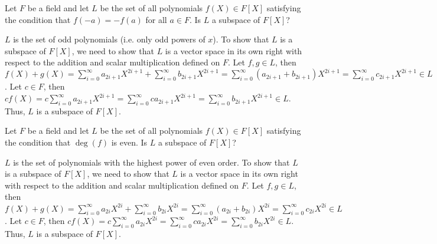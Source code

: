 \begin{ProbBox} %
\begin{problem}[Golan 132]
Let $F$ be a field and let $L$ be the set of all polynomials $f(X) \in F[X]$
satisfying the condition that $f(-a) = -f(a)$ for all $a\in F$.  Is $L$ a
subspace of $F[X]$?
\end{problem}
\smallskip
\begin{solution}
$L$ is the set of odd polynomials (i.e. only odd powers of $x$). To show that $L$ is a subspace of $F[X]$, we need to show that $L$ is a vector space in its own right with respect to the addition and scalar multiplication defined on $F$. Let $f,g \in L$, then $f(X)+g(X)=\sum\limits_{i=0}^\infty a_{2i+1}X^{2i+1} + \sum\limits_{i=0}^\infty b_{2i+1}X^{2i+1} = \sum\limits_{i=0}^\infty (a_{2i+1} + b_{2i+1})X^{2i+1} = \sum\limits_{i=0}^\infty c_{2i+1}X^{2i+1} \in L$. Let $c \in F$, then $cf(X) = c\sum\limits_{i=0}^\infty a_{2i+1}X^{2i+1} = \sum\limits_{i=0}^\infty ca_{2i+1}X^{2i+1} = \sum\limits_{i=0}^\infty b_{2i+1}X^{2i+1} \in L$. Thus, $L$ is a subspace of $F[X]$.
\end{solution}
\end{ProbBox}
\probskip

\begin{ProbBox} %
\begin{problem}[Golan 133]
Let $F$ be a field and let $L$ be the set of all polynomials $f(X) \in F[X]$
satisfying the condition that $\deg(f)$ is even.  Is $L$ a subspace of $F[X]$?
\end{problem}
\smallskip
\begin{solution}
$L$ is the set of polynomials with the highest power of even order. To show that $L$ is a subspace of $F[X]$, we need to show that $L$ is a vector space in its own right with respect to the addition and scalar multiplication defined on $F$. Let $f,g \in L$, then $f(X)+g(X)=\sum\limits_{i=0}^\infty a_{2i}X^{2i} + \sum\limits_{i=0}^\infty b_{2i}X^{2i} = \sum\limits_{i=0}^\infty (a_{2i} + b_{2i})X^{2i} = \sum\limits_{i=0}^\infty c_{2i}X^{2i} \in L$. Let $c \in F$, then $cf(X) = c\sum\limits_{i=0}^\infty a_{2i}X^{2i} = \sum\limits_{i=0}^\infty ca_{2i}X^{2i} = \sum\limits_{i=0}^\infty b_{2i}X^{2i} \in L$. Thus, $L$ is a subspace of $F[X]$.
\end{solution}
\end{ProbBox}
\probskip

